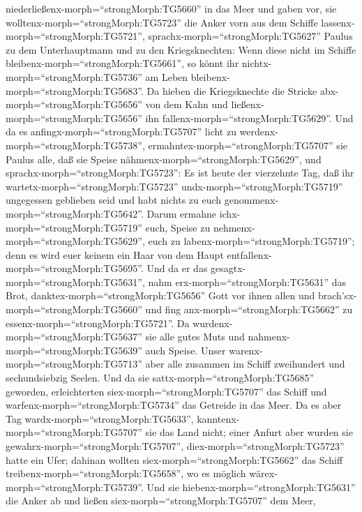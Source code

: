 niederließenx-morph=``strongMorph:TG5660'' in das Meer und gaben vor,
sie wolltenx-morph=``strongMorph:TG5723'' die Anker vorn aus dem Schiffe
lassenx-morph=``strongMorph:TG5721'', 
sprachx-morph=``strongMorph:TG5627'' Paulus zu dem Unterhauptmann und zu
den Kriegsknechten: Wenn diese nicht im Schiffe
bleibenx-morph=``strongMorph:TG5661'', so könnt ihr
nichtx-morph=``strongMorph:TG5736'' am Leben
bleibenx-morph=``strongMorph:TG5683''.  Da hieben die
Kriegsknechte die Stricke abx-morph=``strongMorph:TG5656'' von dem Kahn
und ließenx-morph=``strongMorph:TG5656'' ihn
fallenx-morph=``strongMorph:TG5629''.  Und da es
anfingx-morph=``strongMorph:TG5707'' licht zu
werdenx-morph=``strongMorph:TG5738'',
ermahntex-morph=``strongMorph:TG5707'' sie Paulus alle, daß sie Speise
nähmenx-morph=``strongMorph:TG5629'', und
sprachx-morph=``strongMorph:TG5723'': Es ist heute der vierzehnte Tag,
daß ihr wartetx-morph=``strongMorph:TG5723''
undx-morph=``strongMorph:TG5719'' ungegessen geblieben seid und habt
nichts zu euch genommenx-morph=``strongMorph:TG5642''. 
Darum ermahne ichx-morph=``strongMorph:TG5719'' euch, Speise zu
nehmenx-morph=``strongMorph:TG5629'', euch zu
labenx-morph=``strongMorph:TG5719''; denn es wird euer keinem ein Haar
von dem Haupt entfallenx-morph=``strongMorph:TG5695''.  Und
da er das gesagtx-morph=``strongMorph:TG5631'', nahm
erx-morph=``strongMorph:TG5631'' das Brot,
danktex-morph=``strongMorph:TG5656'' Gott vor ihnen allen und
brach'sx-morph=``strongMorph:TG5660'' und fing
anx-morph=``strongMorph:TG5662'' zu essenx-morph=``strongMorph:TG5721''.
 Da wurdenx-morph=``strongMorph:TG5637'' sie alle gutes
Muts und nahmenx-morph=``strongMorph:TG5639'' auch Speise. 
Unser warenx-morph=``strongMorph:TG5713'' aber alle zusammen im Schiff
zweihundert und sechundsiebzig Seelen.  Und da sie
sattx-morph=``strongMorph:TG5685'' geworden, erleichterten
siex-morph=``strongMorph:TG5707'' das Schiff und
warfenx-morph=``strongMorph:TG5734'' das Getreide in das Meer.
 Da es aber Tag wardx-morph=``strongMorph:TG5633'',
kanntenx-morph=``strongMorph:TG5707'' sie das Land nicht; einer Anfurt
aber wurden sie gewahrx-morph=``strongMorph:TG5707'',
diex-morph=``strongMorph:TG5723'' hatte ein Ufer; dahinan wollten
siex-morph=``strongMorph:TG5662'' das Schiff
treibenx-morph=``strongMorph:TG5658'', wo es möglich
wärex-morph=``strongMorph:TG5739''.  Und sie
hiebenx-morph=``strongMorph:TG5631'' die Anker ab und ließen
siex-morph=``strongMorph:TG5707'' dem Meer,
